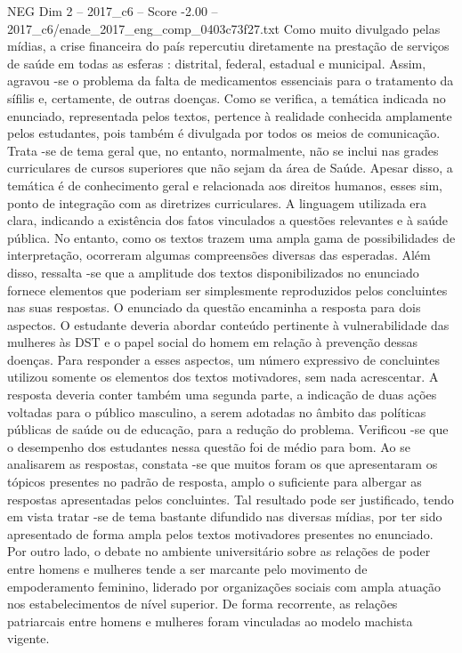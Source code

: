 \begin{textsample}{NEG Dim 2 – 2017\_c6 – Score -2.00 – 2017\_c6/enade\_2017\_eng\_comp\_0403c73f27.txt}
Como muito divulgado pelas mídias, a crise financeira do país repercutiu diretamente na prestação de serviços de saúde em todas as esferas : distrital, federal, estadual e municipal.
Assim, agravou -se o problema da falta de medicamentos essenciais para o tratamento da sífilis e, certamente, de outras doenças.
Como se verifica, a temática indicada no enunciado, representada pelos textos, pertence à realidade conhecida amplamente pelos estudantes, pois também é divulgada por todos os meios de comunicação.
Trata -se de tema geral que, no entanto, normalmente, não se inclui nas grades curriculares de cursos superiores que não sejam da área de Saúde.
Apesar disso, a temática é de conhecimento geral e relacionada aos direitos humanos, esses sim, ponto de integração com as diretrizes curriculares.
A linguagem utilizada era clara, indicando a existência dos fatos vinculados a questões relevantes e à saúde pública.
No entanto, como os textos trazem uma ampla gama de possibilidades de interpretação, ocorreram algumas compreensões diversas das esperadas.
Além disso, ressalta -se que a amplitude dos textos disponibilizados no enunciado fornece elementos que poderiam ser simplesmente reproduzidos pelos concluintes nas suas respostas.
O enunciado da questão encaminha a resposta para dois aspectos.
O estudante deveria abordar conteúdo pertinente à vulnerabilidade das mulheres às DST e o papel social do homem em relação à prevenção dessas doenças.
Para responder a esses aspectos, um número expressivo de concluintes utilizou somente os elementos dos textos motivadores, sem nada acrescentar.
A resposta deveria conter também uma segunda parte, a indicação de duas ações voltadas para o público masculino, a serem adotadas no âmbito das políticas públicas de saúde ou de educação, para a redução do problema.
Verificou -se que o desempenho dos estudantes nessa questão foi de médio para bom.
Ao se analisarem as respostas, constata -se que muitos foram os que apresentaram os tópicos presentes no padrão de resposta, amplo o suficiente para albergar as respostas apresentadas pelos concluintes.
Tal resultado pode ser justificado, tendo em vista tratar -se de tema bastante difundido nas diversas mídias, por ter sido apresentado de forma ampla pelos textos motivadores presentes no enunciado.
Por outro lado, o debate no ambiente universitário sobre as relações de poder entre homens e mulheres tende a ser marcante pelo movimento de empoderamento feminino, liderado por organizações sociais com ampla atuação nos estabelecimentos de nível superior.
De forma recorrente, as relações patriarcais entre homens e mulheres foram vinculadas ao modelo machista vigente.

\end{textsample}
